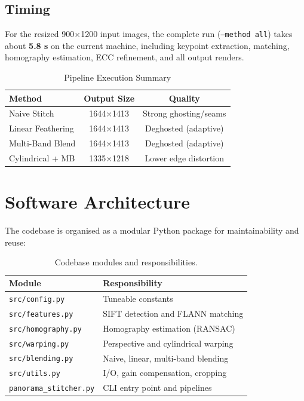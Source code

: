 \documentclass[conference]{IEEEtran}
\begin{document}
\subsection{Timing}

For the resized 900$\times$1200 input images, the complete run (\texttt{--method all})
takes about \textbf{5.8 s} on the current machine, including keypoint
extraction, matching, homography estimation, ECC refinement, and all output
renders.

\begin{table}[!t]
  \centering
  \caption{Pipeline Execution Summary}
  \label{tab:timing}
  \begin{tabular}{lcc}
    \toprule
    \textbf{Method} & \textbf{Output Size} & \textbf{Quality} \\
    \midrule
    Naive Stitch           & 1644$\times$1413 & Strong ghosting/seams  \\
    Linear Feathering      & 1644$\times$1413 & Deghosted (adaptive)   \\
    Multi-Band Blend       & 1644$\times$1413 & Deghosted (adaptive)   \\
    Cylindrical + MB       & 1335$\times$1218 & Lower edge distortion  \\
    \bottomrule
  \end{tabular}
\end{table}


\FloatBarrier
\section{Software Architecture}
\label{sec:code}

The codebase is organised as a modular Python package for maintainability
and reuse:

\begin{table}[!t]
  \centering
  \caption{Codebase modules and responsibilities.}
  \label{tab:modules}
  \begin{tabular}{p{}p{}}
    \toprule
    \textbf{Module} & \textbf{Responsibility} \\
    \midrule
    \texttt{src/config.py}     & Tuneable constants \\
    \texttt{src/features.py}   & SIFT detection and FLANN matching \\
    \texttt{src/homography.py} & Homography estimation (RANSAC) \\
    \texttt{src/warping.py}    & Perspective and cylindrical warping \\
    \texttt{src/blending.py}   & Naive, linear, multi-band blending \\
    \texttt{src/utils.py}      & I/O, gain compensation, cropping \\
    \texttt{panorama\_stitcher.py}  & CLI entry point and pipelines \\
    \bottomrule
  \end{tabular}
\end{table}
\end{document}

